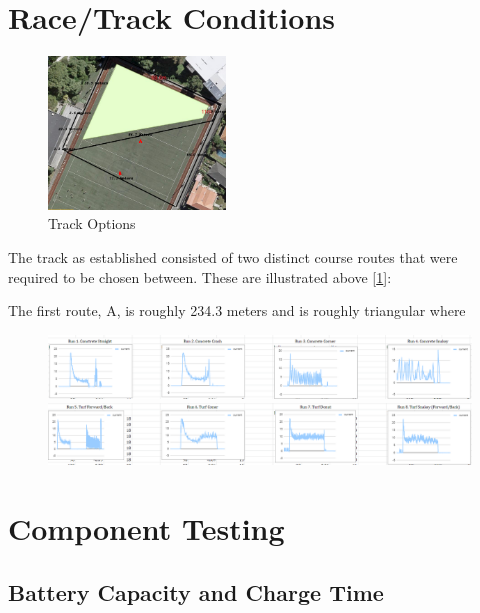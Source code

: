 \documentclass[11pt]{article}
\begin{document}
\section{Race/Track Conditions}
\begin{figure}[h!]
    \begin{center}
        \includegraphics[width=0.42\textwidth]{inc/tracks.png}
        \caption{Track Options \cite{DANNYB}}
        \label{fig:routes}
    \end{center}
\end{figure}

The track as established consisted of two distinct course routes that were required to be chosen between. These are illustrated above [\ref{fig:routes}]: 

The first route, A, is roughly 234.3 meters and is roughly triangular where


\begin{figure}[h!]
    \begin{center}
        \includegraphics[width=\textwidth]{inc/contrete_behaviour.png}
        \includegraphics[width=\textwidth]{inc/turf_behaviour.png}
    \end{center}
\end{figure}

\section{Component Testing}
\subsection{Battery Capacity and Charge Time}
\end{document}
